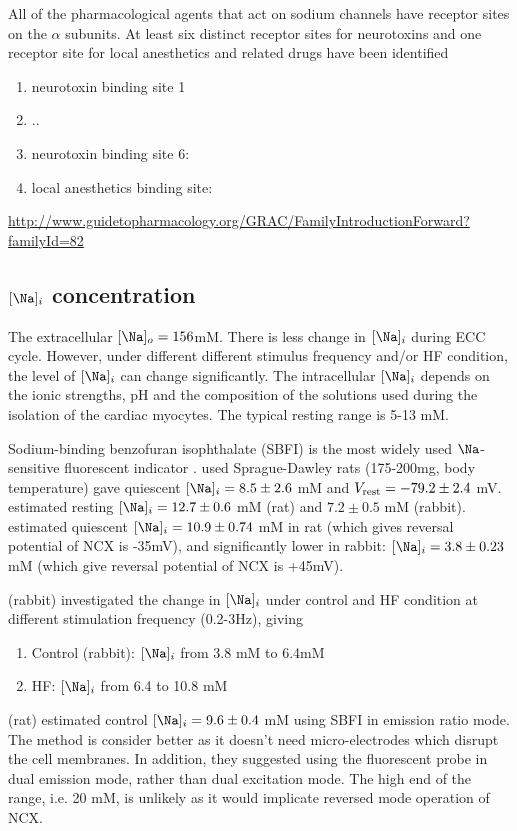 All of the pharmacological agents that act on sodium channels have receptor
sites on the $\alpha$ subunits. At least six distinct receptor sites for
neurotoxins and one receptor site for local anesthetics and related drugs have
been identified
\begin{enumerate}
  \item neurotoxin binding site 1
  \item ..
  \item neurotoxin binding site 6:
  \item local anesthetics binding site:
\end{enumerate}
\url{http://www.guidetopharmacology.org/GRAC/FamilyIntroductionForward?familyId=82}

\subsection{$[\Na]_i$ concentration}

The extracellular $[\Na]_o = 156$mM. There is less change in $[\Na]_i$ during
ECC cycle. However, under different different stimulus frequency and/or HF
condition, the level of $[\Na]_i$ can change significantly. The intracellular
$[\Na]_i$ depends on the ionic strengths, pH and the composition of the
solutions used during the isolation of the cardiac myocytes.
The typical resting range is 5-13 mM.

Sodium-binding benzofuran isophthalate (SBFI) is the most widely used
$\Na$-sensitive fluorescent indicator \citep{minta1989Na}.
\citep{Grupp1985} used Sprague-Dawley rats (175-200mg, body temperature) gave
quiescent $[\Na]_i = 8.5\pm 2.6$ mM and $V_{\text{rest}}=-79.2\pm 2.4$ mV.
\citep{Shattock1989} estimated resting $[\Na]_i=12.7\pm 0.6$ mM (rat) and
$7.2\pm 0.5$ mM (rabbit).
\citep{Levi1994} estimated quiescent $[\Na]_i=10.9\pm 0.74$ mM in rat (which
gives reversal potential of NCX is -35mV), and significantly lower in rabbit:
$[\Na]_i=3.8\pm 0.23$mM (which give reversal potential of NCX is +45mV).

\citep{Baartscheer2003} (rabbit) investigated the change in $[\Na]_i$ under
control and HF condition at different stimulation frequency (0.2-3Hz), giving
\begin{enumerate}
  \item Control (rabbit): $[\Na]_i$ from 3.8 mM to 6.4mM
  \item HF: $[\Na]_i$ from 6.4 to 10.8 mM
\end{enumerate}

\citep{Baartscheer1997} (rat) estimated control $[\Na]_i=9.6 \pm 0.4$ mM using
SBFI in emission ratio mode. The method is consider better as it doesn't need
micro-electrodes which disrupt the cell membranes. In addition, they
suggested using the fluorescent probe in dual emission mode, rather than
dual excitation mode. The high end of the range, i.e. 20 mM, is unlikely as it
would implicate reversed mode operation of NCX.


